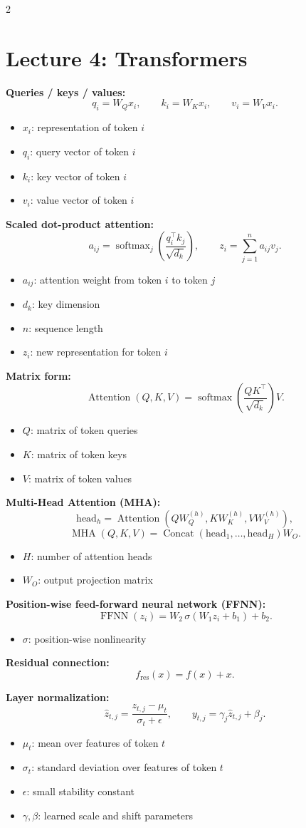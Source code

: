 \documentclass[10pt]{article}
\newcommand{\softmax}{\operatorname{softmax}}
\newenvironment{symdefs}{\begin{itemize}[leftmargin=1.1em, topsep=1pt, itemsep=0pt, parsep=0pt]}{\end{itemize}}
\newcommand{\sym}[2]{\item \textbf{#1}: #2}
\begin{document}
\begin{multicols*}{2}
\section*{Lecture 4: Transformers}
\textbf{Queries / keys / values:}
\[
q_i=W_Q x_i,
\qquad
k_i=W_K x_i,
\qquad
v_i=W_V x_i.
\]
\begin{symdefs}
\sym{\(x_i\)}{representation of token \(i\)}
\sym{\(q_i\)}{query vector of token \(i\)}
\sym{\(k_i\)}{key vector of token \(i\)}
\sym{\(v_i\)}{value vector of token \(i\)}
\end{symdefs}

\textbf{Scaled dot-product attention:}
\[
a_{ij}
=
\softmax_j\!\left(\frac{q_i^\top k_j}{\sqrt{d_k}}\right),
\qquad
z_i=\sum_{j=1}^{n} a_{ij} v_j.
\]
\begin{symdefs}
\sym{\(a_{ij}\)}{attention weight from token \(i\) to token \(j\)}
\sym{\(d_k\)}{key dimension}
\sym{\(n\)}{sequence length}
\sym{\(z_i\)}{new representation for token \(i\)}
\end{symdefs}

\textbf{Matrix form:}
\[
\operatorname{Attention}(Q,K,V)
=
\softmax\!\left(\frac{QK^\top}{\sqrt{d_k}}\right)V.
\]
\begin{symdefs}
\sym{\(Q\)}{matrix of token queries}
\sym{\(K\)}{matrix of token keys}
\sym{\(V\)}{matrix of token values}
\end{symdefs}

\textbf{Multi-Head Attention (MHA):}
\[
\text{head}_h
=
\operatorname{Attention}(QW_Q^{(h)}, KW_K^{(h)}, VW_V^{(h)}),
\]
\[
\operatorname{MHA}(Q,K,V)
=
\operatorname{Concat}(\text{head}_1,\dots,\text{head}_H)W_O.
\]
\begin{symdefs}
\sym{\(H\)}{number of attention heads}
\sym{\(W_O\)}{output projection matrix}
\end{symdefs}

\textbf{Position-wise feed-forward neural network (FFNN):}
\[
\operatorname{FFNN}(z_i)=W_2\,\sigma(W_1 z_i + b_1)+b_2.
\]
\begin{symdefs}
\sym{\(\sigma\)}{position-wise nonlinearity}
\end{symdefs}

\textbf{Residual connection:}
\[
f_{\text{res}}(x)=f(x)+x.
\]

\textbf{Layer normalization:}
\[
\hat{z}_{t,j}=\frac{z_{t,j}-\mu_t}{\sigma_t+\epsilon},
\qquad
y_{t,j}=\gamma_j \hat{z}_{t,j}+\beta_j.
\]
\begin{symdefs}
\sym{\(\mu_t\)}{mean over features of token \(t\)}
\sym{\(\sigma_t\)}{standard deviation over features of token \(t\)}
\sym{\(\epsilon\)}{small stability constant}
\sym{\(\gamma,\beta\)}{learned scale and shift parameters}
\end{symdefs}


\end{multicols*}
\end{document}
